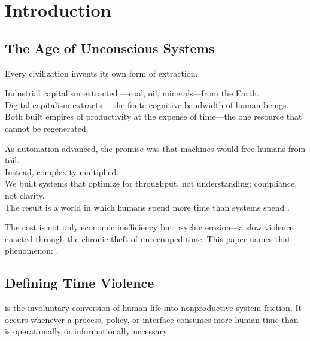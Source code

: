 
\section{Introduction}
\label{sec:introduction}

\subsection{The Age of Unconscious Systems}
\label{sec:unconscious-systems}

Every civilization invents its own form of extraction.

Industrial capitalism extracted —coal, oil, minerals—from the Earth.\\
Digital capitalism extracts —the finite cognitive bandwidth of human beings.\\
Both built empires of productivity at the expense of time—the one resource that cannot be regenerated.

As automation advanced, the promise was that machines would free humans from toil.\\
Instead, complexity multiplied.\\
We built systems that optimize for throughput, not understanding; compliance, not clarity.\\
The result is a world in which humans spend more time  than systems spend .

The cost is not only economic inefficiency but psychic erosion—a slow violence enacted through the chronic theft of unrecouped time. This paper names that phenomenon: .

\subsection{Defining Time Violence}
\label{sec:defining-tv}

\begin{definition}
\label{def:time-violence}
 is the involuntary conversion of human life into nonproductive system friction. It occurs whenever a process, policy, or interface consumes more human time than is operationally or informationally necessary.
\end{definition}

